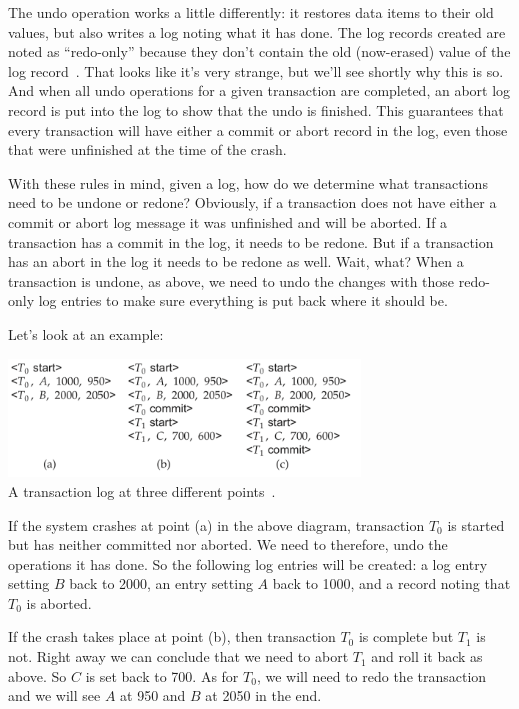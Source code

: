 The undo operation works a little differently: it restores data items to their old values, but also writes a log noting what it has done. The log records created are noted as ``redo-only'' because they don't contain the old (now-erased) value of the log record~\cite{dsc}. That looks like it's very strange, but we'll see shortly why this is so. And when all undo operations for a given transaction are completed, an abort log record is put into the log to show that the undo is finished. This guarantees that every transaction will have either a commit or abort record in the log, even those that were unfinished at the time of the crash.

With these rules in mind, given a log, how do we determine what transactions need to be undone or redone? Obviously, if a transaction does not have either a commit or abort log message it was unfinished and will be aborted. If a transaction has a commit in the log, it needs to be redone. But if a transaction has an abort in the log it needs to be redone as well. Wait, what? When a transaction is undone, as above, we need to undo the changes with those redo-only log entries to make sure everything is put back where it should be.

Let's look at an example:

\begin{center}
	\includegraphics[width=0.7\textwidth]{images/transaction-log}\\
	A transaction log at three different points~\cite{dsc}.
\end{center}

If the system crashes at point (a) in the above diagram, transaction $T_{0}$ is started but has neither committed nor aborted. We need to therefore, undo the operations it has done. So the following log entries will be created: a log entry setting $B$ back to 2000, an entry setting $A$ back to 1000, and a record noting that $T_{0}$ is aborted.

If the crash takes place at point (b), then transaction $T_{0}$ is complete but $T_{1}$ is not. Right away we can conclude that we need to abort $T_{1}$ and roll it back as above. So $C$ is set back to 700. As for $T_{0}$, we will need to redo the transaction and we will see $A$ at 950 and $B$ at 2050 in the end.

